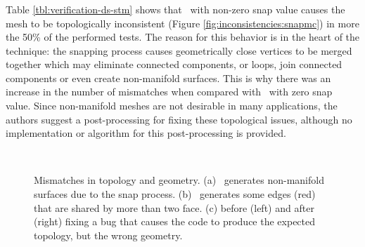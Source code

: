 \subsubsection{\snapmc}

Table \ref{tbl:verification-ds-stm} shows that \snapmc\ with non-zero snap value
causes the mesh to be topologically inconsistent (Figure 
\ref{fig:inconsistencies:snapmc}) in more the 50\% of the performed tests. 
The reason for this behavior is in the heart of the technique: the snapping process 
causes geometrically close vertices to be merged together 
which may eliminate connected components, or loops, join connected
components or even create non-manifold surfaces. This is why there was an increase
in the number of mismatches when compared with \snapmc\ with zero snap value.
Since non-manifold meshes are not desirable in many applications, the authors 
suggest a post-processing for fixing these topological issues, although no implementation
or algorithm for this post-processing is provided.

\begin{figure}[t]
\centering
{} ~~~~~~~~
 ~~~~~~~~
\caption{Mismatches in topology and geometry. (a) \snapmc\ generates
  non-manifold surfaces due to the snap process. (b)
  \matlab\ generates some edges (red) that are shared by more than two
  face. (c) \mcsimpleflow before (left) and after (right) fixing a bug
  that causes the code to produce the expected topology, but the wrong
  geometry.}
\label{fig:inconsistencies}
\end{figure}

